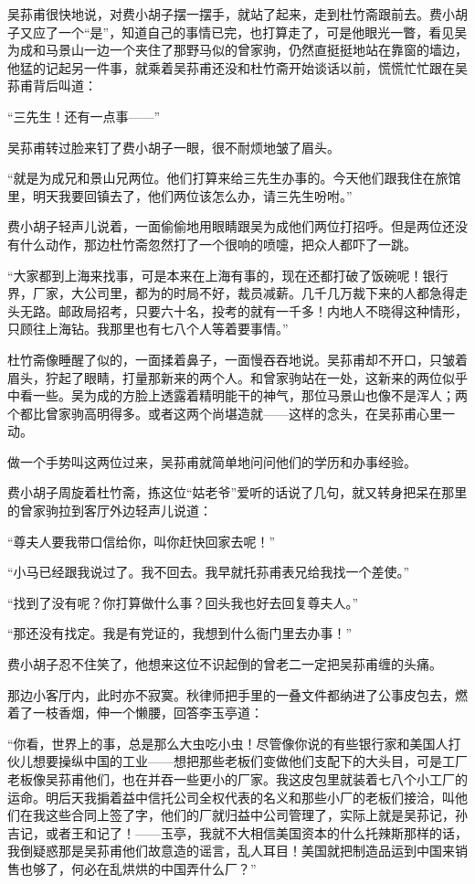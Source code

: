 \par 吴荪甫很快地说，对费小胡子摆一摆手，就站了起来，走到杜竹斋跟前去。费小胡子又应了一个“是”，知道自己的事情已完，也打算走了，可是他眼光一瞥，看见吴为成和马景山一边一个夹住了那野马似的曾家驹，仍然直挺挺地站在靠窗的墙边，他猛的记起另一件事，就乘着吴荪甫还没和杜竹斋开始谈话以前，慌慌忙忙跟在吴荪甫背后叫道：
\par “三先生！还有一点事——”
\par 吴荪甫转过脸来钉了费小胡子一眼，很不耐烦地皱了眉头。
\par “就是为成兄和景山兄两位。他们打算来给三先生办事的。今天他们跟我住在旅馆里，明天我要回镇去了，他们两位该怎么办，请三先生吩咐。”
\par 费小胡子轻声儿说着，一面偷偷地用眼睛跟吴为成他们两位打招呼。但是两位还没有什么动作，那边杜竹斋忽然打了一个很响的喷嚏，把众人都吓了一跳。
\par “大家都到上海来找事，可是本来在上海有事的，现在还都打破了饭碗呢！银行界，厂家，大公司里，都为的时局不好，裁员减薪。几千几万裁下来的人都急得走头无路。邮政局招考，只要六十名，投考的就有一千多！内地人不晓得这种情形，只顾往上海钻。我那里也有七八个人等着要事情。”
\par 杜竹斋像睡醒了似的，一面揉着鼻子，一面慢吞吞地说。吴荪甫却不开口，只皱着眉头，狞起了眼睛，打量那新来的两个人。和曾家驹站在一处，这新来的两位似乎中看一些。吴为成的方脸上透露着精明能干的神气，那位马景山也像不是浑人；两个都比曾家驹高明得多。或者这两个尚堪造就——这样的念头，在吴荪甫心里一动。
\par 做一个手势叫这两位过来，吴荪甫就简单地问问他们的学历和办事经验。
\par 费小胡子周旋着杜竹斋，拣这位“姑老爷”爱听的话说了几句，就又转身把呆在那里的曾家驹拉到客厅外边轻声儿说道：
\par “尊夫人要我带口信给你，叫你赶快回家去呢！”
\par “小马已经跟我说过了。我不回去。我早就托荪甫表兄给我找一个差使。”
\par “找到了没有呢？你打算做什么事？回头我也好去回复尊夫人。”
\par “那还没有找定。我是有党证的，我想到什么衙门里去办事！”
\par 费小胡子忍不住笑了，他想来这位不识起倒的曾老二一定把吴荪甫缠的头痛。
\par 那边小客厅内，此时亦不寂寞。秋律师把手里的一叠文件都纳进了公事皮包去，燃着了一枝香烟，伸一个懒腰，回答李玉亭道：
\par “你看，世界上的事，总是那么大虫吃小虫！尽管像你说的有些银行家和美国人打伙儿想要操纵中国的工业——想把那些老板们变做他们支配下的大头目，可是工厂老板像吴荪甫他们，也在并吞一些更小的厂家。我这皮包里就装着七八个小工厂的运命。明后天我掮着益中信托公司全权代表的名义和那些小厂的老板们接洽，叫他们在我这些合同上签了字，他们的厂就归益中公司管理了，实际上就是吴荪记，孙吉记，或者王和记了！——玉亭，我就不大相信美国资本的什么托辣斯那样的话，我倒疑惑那是吴荪甫他们故意造的谣言，乱人耳目！美国就把制造品运到中国来销售也够了，何必在乱烘烘的中国弄什么厂？”
